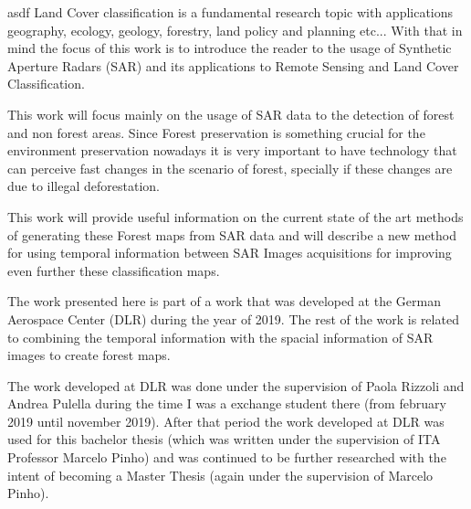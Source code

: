 asdf Land Cover classification is a fundamental research topic with applications geography,
ecology, geology, forestry, land policy and planning etc... With that in mind the focus of this work is to introduce the reader to the usage of Synthetic Aperture Radars (SAR) and its applications to Remote Sensing and Land Cover Classification. 

This work will focus mainly on the usage of SAR data to the detection of forest and non forest areas. Since Forest preservation is something crucial for the environment preservation nowadays it is very important to have technology that can perceive fast changes in the scenario of forest, specially if these changes are due to illegal deforestation. 

This work will provide useful information on the current state of the art methods of generating these Forest maps from SAR data and will describe a new method for using temporal information between SAR Images acquisitions for improving even further these classification maps.

The work presented here is part of a work that was developed at the German Aerospace Center (DLR) during the year of 2019. The rest of the work is related to combining the temporal information with the spacial information of SAR images to create forest maps.

The work developed at DLR was done under the supervision of Paola Rizzoli and Andrea Pulella during the time I was a exchange student there (from february 2019 until november 2019). After that period the work developed at DLR was used for this bachelor thesis (which was written under the supervision of ITA Professor Marcelo Pinho) and was continued to be further researched with the intent of becoming a Master Thesis (again under the supervision of Marcelo Pinho). 